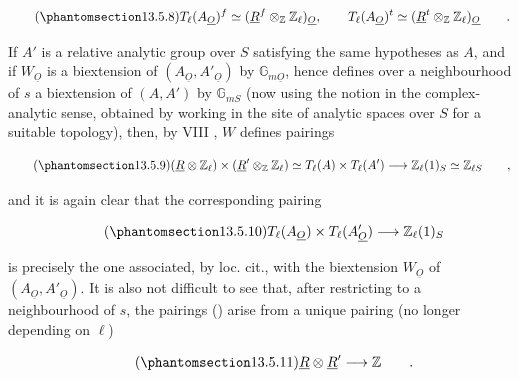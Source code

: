 \begin{equation}\tag{\SGARefTarget{sga7.sga7i.eix.n13-5-8}{13.5.8}}
 T_\ell(A_{\underline O})^f\simeq
 (\underline R^f\otimes_{\mathbb Z}\mathbb Z_\ell)_{\underline O},
 \qquad
 T_\ell(A_{\underline O})^t\simeq
 (\underline R^t\otimes_{\mathbb Z}\mathbb Z_\ell)_{\underline O}
 \qquad .
\end{equation}

\noindent
If $A'$ is a relative analytic group over $S$ satisfying the same
hypotheses as $A$, and if $W_{\underline O}$ is a biextension of
$(A_{\underline O},A'_{\underline O})$ by
$\mathbb G_{m\underline O}$, hence defines over a neighbourhood of $s$
a biextension of $(A,A')$ by $\mathbb G_{mS}$ (now using the notion in
the complex-analytic sense, obtained by working in the site of analytic
spaces over $S$ for a suitable topology), then, by VIII , $W$
defines pairings

\begin{equation}\tag{\SGARefTarget{sga7.sga7i.eix.n13-5-9}{13.5.9}}
 (\underline R\otimes\mathbb Z_\ell)\times
 (\underline R'\otimes_{\mathbb Z}\mathbb Z_\ell)
 \simeq T_\ell(A)\times T_\ell(A')
 \longrightarrow\mathbb Z_\ell(1)_S
 \simeq\mathbb Z_{\ell S}\qquad ,
\end{equation}

\noindent
and it is again clear that the corresponding pairing

\begin{equation}\tag{\SGARefTarget{sga7.sga7i.eix.n13-5-10}{13.5.10}}
 T_\ell(A_{\underline O})\times T_\ell(A'_{\underline O})
 \longrightarrow\mathbb Z_\ell(1)_S
\end{equation}

\noindent
is precisely the one associated, by loc. cit., with the biextension
$W_{\underline O}$ of $(A_{\underline O},A'_{\underline O})$.  It is
also not difficult to see that, after restricting to a neighbourhood
of $s$, the pairings () arise from a unique pairing (no longer
depending on $\ell$)

\begin{equation}\tag{\SGARefTarget{sga7.sga7i.eix.n13-5-11}{13.5.11}}
 \underline R\otimes\underline R'\longrightarrow\mathbb Z
 \qquad .
\end{equation}

